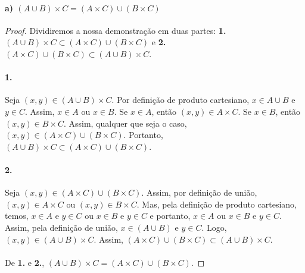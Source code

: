 \documentclass[9pt,twocolumn,a4paper]{article}
\begin{document}
    \paragraph{a) $(A \cup B) \times C = (A \times C) \cup (B \times C)$}
    \begin{proof}
    Dividiremos a nossa demonstração em duas partes: \textbf{1.} $(A \cup B) \times C \subset (A \times C) \cup (B \times C)$ e \textbf{2.} $(A \times C) \cup (B \times C) \subset (A \cup B) \times C$.

    \paragraph{1.}
    Seja $(x, y) \in (A \cup B) \times C$. Por definição de produto cartesiano, $x \in A \cup B$ e $y \in C$. Assim, $x \in A$ ou $x \in B$. Se $x \in A$, então $(x, y) \in A \times C$. Se $x \in B$, então $(x, y) \in B \times C$. Assim, qualquer que seja o caso, $(x, y) \in (A \times C) \cup (B \times C)$. Portanto, $(A \cup B) \times C \subset (A \times C) \cup (B \times C)$.

    \paragraph{2.}
    Seja $(x, y) \in (A \times C) \cup (B \times C)$. Assim, por definição de união, $(x, y) \in A \times C$ ou $(x, y) \in B \times C$. Mas, pela definição de produto cartesiano, temos, $x \in A$ e $y \in C$ ou $x \in B$ e $y \in C$ e portanto, $x \in A$ ou $x \in B$ e $y \in C$. Assim, pela definição de união, $x \in (A \cup B)$ e $y \in C$. Logo, $(x, y) \in (A \cup B) \times C$. Assim, $(A \times C) \cup (B \times C) \subset (A \cup B) \times C$.
    
    \paragraph{}
    De \textbf{1.} e \textbf{2.}, $(A \cup B) \times C = (A \times C) \cup (B \times C)$.
    \end{proof}
    
\end{document}

